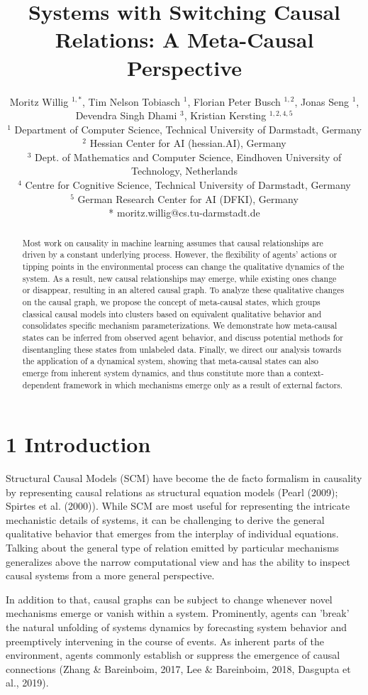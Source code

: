 \documentclass[10pt]{article}
\title{Systems with Switching Causal Relations: A Meta-Causal Perspective }
\author{Moritz Willig ${ }^{1, *}$, Tim Nelson Tobiasch ${ }^{1}$, Florian Peter Busch ${ }^{1,2}$, Jonas Seng ${ }^{1}$, Devendra Singh Dhami ${ }^{3}$, Kristian Kersting ${ }^{1,2,4,5}$\\
${ }^{1}$ Department of Computer Science, Technical University of Darmstadt, Germany\\
${ }^{2}$ Hessian Center for AI (hessian.AI), Germany\\
${ }^{3}$ Dept. of Mathematics and Computer Science, Eindhoven University of Technology, Netherlands\\
${ }^{4}$ Centre for Cognitive Science, Technical University of Darmstadt, Germany\\
${ }^{5}$ German Research Center for AI (DFKI), Germany\\
* moritz.willig@cs.tu-darmstadt.de}
\date{}
\begin{document}
\maketitle
\captionsetup{singlelinecheck=false}


\begin{abstract}
Most work on causality in machine learning assumes that causal relationships are driven by a constant underlying process. However, the flexibility of agents' actions or tipping points in the environmental process can change the qualitative dynamics of the system. As a result, new causal relationships may emerge, while existing ones change or disappear, resulting in an altered causal graph. To analyze these qualitative changes on the causal graph, we propose the concept of meta-causal states, which groups classical causal models into clusters based on equivalent qualitative behavior and consolidates specific mechanism parameterizations. We demonstrate how meta-causal states can be inferred from observed agent behavior, and discuss potential methods for disentangling these states from unlabeled data. Finally, we direct our analysis towards the application of a dynamical system, showing that meta-causal states can also emerge from inherent system dynamics, and thus constitute more than a context-dependent framework in which mechanisms emerge only as a result of external factors.
\end{abstract}

\section*{1 Introduction}
Structural Causal Models (SCM) have become the de facto formalism in causality by representing causal relations as structural equation models (Pearl (2009); Spirtes et al. (2000)). While SCM are most useful for representing the intricate mechanistic details of systems, it can be challenging to derive the general qualitative behavior that emerges from the interplay of individual equations. Talking about the general type of relation emitted by particular mechanisms generalizes above the narrow computational view and has the ability to inspect causal systems from a more general perspective.

In addition to that, causal graphs can be subject to change whenever novel mechanisms emerge or vanish within a system. Prominently, agents can 'break' the natural unfolding of systems dynamics by forecasting system behavior and preemptively intervening in the course of events. As inherent parts of the environment, agents commonly establish or suppress the emergence of causal connections (Zhang \& Bareinboim, 2017, Lee \& Bareinboim, 2018, Dasgupta et al., 2019).
\end{document}
